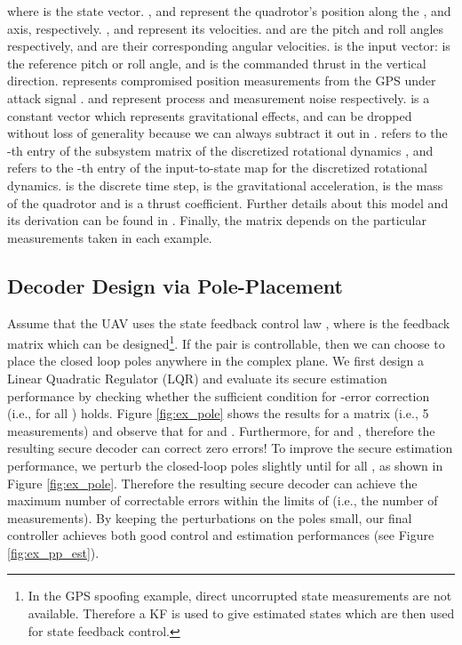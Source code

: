 \documentclass[journal]{IEEEtran}
\begin{document}
\begin{figure*}

\end{figure*}
\noindent 
where  is the state vector. ,  and  represent the quadrotor's position along the ,  and  axis, respectively. ,  and  represent its velocities.  and  are the pitch and roll angles respectively,  and  are their corresponding angular velocities.  is the input vector:  is the reference pitch or roll angle, and  is the commanded thrust in the vertical direction.  represents compromised position measurements from the GPS under attack signal .  and  represent process and measurement noise respectively.  is a constant vector which represents gravitational effects, and can be dropped without loss of generality because we can always subtract it out in .  refers to the -th entry of the subsystem matrix of the discretized rotational dynamics , and  refers to the -th entry of the input-to-state map  for the discretized rotational dynamics.  is the discrete time step,  is the gravitational acceleration,  is the mass of the quadrotor and  is a thrust coefficient. Further details about this model and its derivation can be found in \cite{Bouffard}. Finally, the matrix  depends on the particular measurements taken in each example.



\subsection{Decoder Design via Pole-Placement}

Assume that the UAV uses the state feedback control law , where  is the feedback matrix which can be designed\footnote{In the GPS spoofing example, direct uncorrupted state measurements are not available. Therefore a KF is used to give estimated states which are then used for state feedback control.}. If the pair  is controllable, then we can choose  to place the closed loop poles anywhere in the complex plane. We first design a Linear Quadratic Regulator (LQR) and evaluate its secure estimation performance by checking whether the sufficient condition for -error correction  (i.e.,  for all ) holds. 
Figure \ref{fig:ex_pole} shows the results for a matrix  (i.e., 5 measurements) and observe that  for  and . Furthermore,  for  and , therefore the resulting secure decoder can correct zero errors!
To improve the secure estimation performance, we perturb the closed-loop poles slightly until  for all , as shown in Figure \ref{fig:ex_pole}. Therefore the resulting secure decoder can achieve the maximum number of correctable errors within the limits of  (i.e., the number of measurements). By keeping the perturbations on the poles small, our final controller achieves both good control and estimation performances (see Figure \ref{fig:ex_pp_est}).
\end{document}
